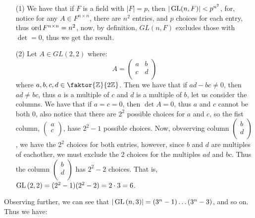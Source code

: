 \begin{example}
  \begin{enumerate}
    \item[(1)] We have that if $F$ is a field with  $|F|=p$, then
      $|\operatorname{GL}(n,F)|<p^{n^2}$, for, notice for any $A \in F^{n \times n}$,
      there are $n^2$ entries, and  $p$ choices for each entry, thus
      $\operatorname{ord} {F^{n \times n}}=n^2$, now, by definition,  $GL(n,F)$ excludes
      those with $\det=0$, thus we get the result.

    \item[(2)] Let $A \in GL(2,2)$ where:
      \begin{equation*}
        A=\begin{pmatrix}
          a   &   b   \\
          c   &   d   \\
        \end{pmatrix}
      \end{equation*}
      where $a,b,c,d \in \faktor{\Z}{2\Z}$. Then we have that if $ad-bc
      \neq 0$, then  $ad \neq bc$, thus $a$ is a multiple of  $c$ and  $d$
      is a multiple of  $b$, let us consider the columns. We have that if
      $a=c=0$, then  $\det{A}=0$, thus $a$ and  $c$ cannot be both  $0$,
      also notice that there are $2^2$ possible choices for  $a$
      and  $c$, so the fist column, $\begin{pmatrix}a \\ c
      \\\end{pmatrix}$, hase $2^2-1$ possible choices. Now, obvserving
      column $\begin{pmatrix}b \\ d \\\end{pmatrix}$, we have the $2^2$
      choices for both entries, however, since  $b$ and  $d$ are
      multiples of eachother, we must exclude the $2$ choices for the
      multiples $ad$ and  $bc$. Thus the column $\begin{pmatrix}b \\ d
      \\\end{pmatrix}$ has $2^2-2$ choices. That is,
      $\operatorname{GL}{(2,2)}=(2^2-1)(2^2-2)=2 \cdot 3=6$.
  \end{enumerate}
\end{example}

Observing further, we can see that $|\operatorname{GL}{(n,3)}|=(3^n-1) \dots (3^n-3)$, and so
on. Thus we have:


